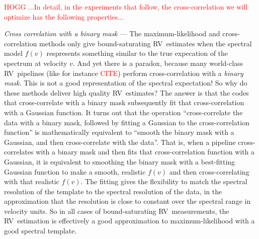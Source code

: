 \documentclass[modern]{aastex63}
\renewcommand{\paragraph}[1]{\bigskip\par\noindent\textsl{#1} ---}
\newcommand{\todo}[1]{\textcolor{red}{#1}}  %
\newcommand{\CITE}{\todo{CITE}}
\newcommand{\acronym}[1]{{\small{#1}}}
\newcommand{\RV}{\acronym{RV}}
\begin{document}
\todo{HOGG ...In detail, in the experiments that follow, the
cross-correlation we will optimize has the following properties...}

\paragraph{Cross correlation with a binary mask}
The maximum-likelihood and cross-correlation methods only give
bound-saturating \RV\ estimates when the spectral model $f(v)$
respresents something similar to the true expecation of the spectrum
at velocity $v$.
And yet there is a paradox, because many world-class \RV\ pipelines
(like for instance \CITE) perform cross-correlation with a
\emph{binary mask}.
This is not a good representation of the spectral expectation! So why
do these methods deliver high quality \RV\ estimates?
The answer is that the codes that cross-correlate with a binary mask
subsequently fit that cross-correlation with a Gaussian function.
It turns out that the operation ``cross-correlate the data with a
binary mask, followed by fitting a Gaussian to the cross-correlation
function'' is mathematically equivalent to ``smooth the binary mask
with a Gaussian, and then cross-correlate with the data''.
That is, when a pipeline cross-correlates with a binary mask and then
fits that cross-correlation function with a Gaussian, it is equivalent
to smoothing the binary mask with a best-fitting Gaussian function to
make a smooth, realistic $f(v)$ and then cross-correlating with that
realistic $f(v)$.
The fitting gives the flexibility to match the spectral resolution of
the template to the spectral resolution of the data, in the
approximation that the resolution is close to constant over the
spectral range in velocity units.
So in all cases of bound-saturating \RV\ measurements, the
\RV\ estimation is effectively a good approximation to
maximum-likelihood with a good spectral template.
\end{document}
